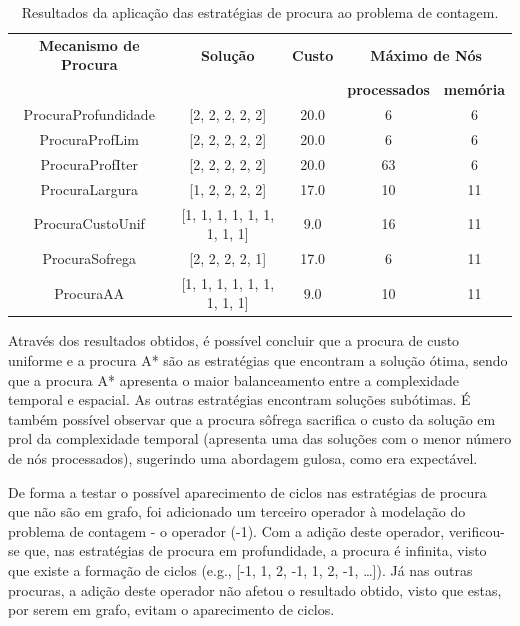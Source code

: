 \begin{table}[htbp]
    \centering
    \caption{Resultados da aplicação das estratégias de procura ao problema de contagem.}
    \label{tab:resultados-procura-contagem}
    \vspace{0.2cm}
    \begin{tabular}{|c|c|c|c|c|}
        \hline
        \textbf{Mecanismo de Procura} & \textbf{Solução} & \textbf{Custo} & \multicolumn{2}{c|}{\textbf{Máximo de Nós}} \\ \cline{4-5}
        &                             &      & \textbf{processados} & \textbf{memória} \\
        \hline
        ProcuraProfundidade & [2, 2, 2, 2, 2]             & 20.0 & 6                    & 6                \\
        \hline
        ProcuraProfLim      & [2, 2, 2, 2, 2]             & 20.0 & 6                    & 6                \\
        \hline
        ProcuraProfIter     & [2, 2, 2, 2, 2]             & 20.0 & 63                   & 6                \\
        \hline
        ProcuraLargura      & [1, 2, 2, 2, 2]             & 17.0 & 10                   & 11               \\
        \hline
        ProcuraCustoUnif    & [1, 1, 1, 1, 1, 1, 1, 1, 1] & 9.0  & 16                   & 11               \\
        \hline
        ProcuraSofrega      & [2, 2, 2, 2, 1]             & 17.0 & 6                    & 11               \\
        \hline
        ProcuraAA           & [1, 1, 1, 1, 1, 1, 1, 1, 1] & 9.0  & 10                   & 11               \\
        \hline
    \end{tabular}
\end{table}


Através dos resultados obtidos, é possível concluir que a procura de custo uniforme e a procura A* são as estratégias que encontram a solução ótima, sendo que a procura A* apresenta o maior balanceamento entre a complexidade temporal e espacial.
As outras estratégias encontram soluções subótimas.
É também possível observar que a procura sôfrega sacrifica o custo da solução em prol da complexidade temporal (apresenta uma das soluções com o menor número de nós processados), sugerindo uma abordagem gulosa, como era expectável.

De forma a testar o possível aparecimento de ciclos nas estratégias de procura que não são em grafo, foi adicionado um terceiro operador à modelação do problema de contagem - o operador (-1).
Com a adição deste operador, verificou-se que, nas estratégias de procura em profundidade, a procura é infinita, visto que existe a formação de ciclos (e.g., [-1, 1, 2, -1, 1, 2, -1, \ldots]).
Já nas outras procuras, a adição deste operador não afetou o resultado obtido, visto que estas, por serem em grafo, evitam o aparecimento de ciclos.

